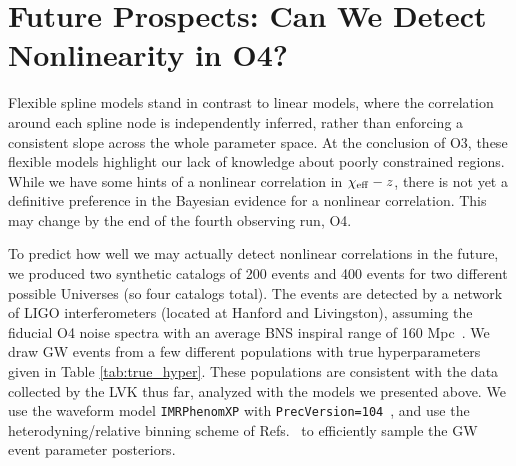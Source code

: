 \documentclass[%
 reprint,
 amsmath,amssymb,
 aps,
 prd,
]{revtex4-2}
\newcommand{\chieff}{\chi_{\rm eff}}
\begin{document}

\section{Future Prospects: Can We Detect Nonlinearity in O4?}
\label{sec:o4_projections}
Flexible spline models stand in contrast to linear models, where the correlation around each spline node is independently inferred, rather than enforcing a consistent slope across the whole parameter space. 
At the conclusion of O3, these flexible models highlight our lack of knowledge about poorly constrained regions. While we have some hints of a nonlinear correlation in $\chieff-z$, there is not yet a definitive preference in the Bayesian evidence for a nonlinear correlation. This may change by the end of the fourth observing run, O4. 

To predict how well we may actually detect nonlinear correlations in the future, we produced two synthetic catalogs of 200 events and 400 events for two different possible Universes (so four catalogs total). The events are detected by a network of LIGO interferometers (located at Hanford and Livingston), assuming the fiducial O4 noise spectra with an average BNS inspiral range of 160 Mpc~\cite{O3_psds}. We draw \ac{GW} events from a few different populations with true hyperparameters given in Table \ref{tab:true_hyper}. These populations are consistent with the data collected by the \ac{LVK} thus far, analyzed with the models we presented above. We use the waveform model \texttt{IMRPhenomXP} with \texttt{PrecVersion=104}~\cite{Pratten:2020ceb}, and use the heterodyning/relative binning scheme of Refs.~\cite{Cornish:2010kf, Cornish:2021lje, Zackay:2018qdy} to efficiently sample the \ac{GW} event parameter posteriors.
\end{document}
